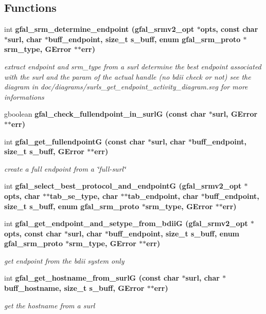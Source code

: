 \subsection*{Functions}
\begin{CompactItemize}
\item 
int \bf{gfal\_\-srm\_\-determine\_\-endpoint} (gfal\_\-srmv2\_\-opt $\ast$opts, const char $\ast$surl, char $\ast$buff\_\-endpoint, size\_\-t s\_\-buff, enum gfal\_\-srm\_\-proto $\ast$srm\_\-type, GError $\ast$$\ast$err)
\begin{CompactList}\small\item\em extract endpoint and srm\_\-type from a surl determine the best endpoint associated with the surl and the param of the actual handle (no bdii check or not) see the diagram in doc/diagrams/surls\_\-get\_\-endpoint\_\-activity\_\-diagram.svg for more informations \item\end{CompactList}\item 
gboolean \bf{gfal\_\-check\_\-fullendpoint\_\-in\_\-surl\-G} (const char $\ast$surl, GError $\ast$$\ast$err)
\item 
int \bf{gfal\_\-get\_\-fullendpoint\-G} (const char $\ast$surl, char $\ast$buff\_\-endpoint, size\_\-t s\_\-buff, GError $\ast$$\ast$err)\label{gfal__common__srm__endpoint_8h_fbb46a068ea2a908160cb7b998377ffd}

\begin{CompactList}\small\item\em create a full endpoint from a \char`\"{}full-surl\char`\"{} \item\end{CompactList}\item 
int \bf{gfal\_\-select\_\-best\_\-protocol\_\-and\_\-endpoint\-G} (gfal\_\-srmv2\_\-opt $\ast$opts, char $\ast$$\ast$tab\_\-se\_\-type, char $\ast$$\ast$tab\_\-endpoint, char $\ast$buff\_\-endpoint, size\_\-t s\_\-buff, enum gfal\_\-srm\_\-proto $\ast$srm\_\-type, GError $\ast$$\ast$err)
\item 
int \bf{gfal\_\-get\_\-endpoint\_\-and\_\-setype\_\-from\_\-bdii\-G} (gfal\_\-srmv2\_\-opt $\ast$opts, const char $\ast$surl, char $\ast$buff\_\-endpoint, size\_\-t s\_\-buff, enum gfal\_\-srm\_\-proto $\ast$srm\_\-type, GError $\ast$$\ast$err)
\begin{CompactList}\small\item\em get endpoint from the bdii system only \item\end{CompactList}\item 
int \bf{gfal\_\-get\_\-hostname\_\-from\_\-surl\-G} (const char $\ast$surl, char $\ast$buff\_\-hostname, size\_\-t s\_\-buff, GError $\ast$$\ast$err)
\begin{CompactList}\small\item\em get the hostname from a surl \item\end{CompactList}\end{CompactItemize}


